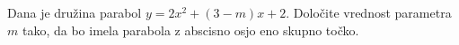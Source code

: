 \documentclass[addpoints]{exam}
\begin{document}
\begin{questions}
\begin{parts}




    \end{parts}



    \question[4]
    Dana je družina parabol $y=2x^2+(3-m)x+2$.
    Določite vrednost parametra $m$ tako, da bo imela parabola z abscisno osjo eno skupno točko.
        

            \begin{solution}[11cm]

            \end{solution}













    





\end{questions}
\end{document}

